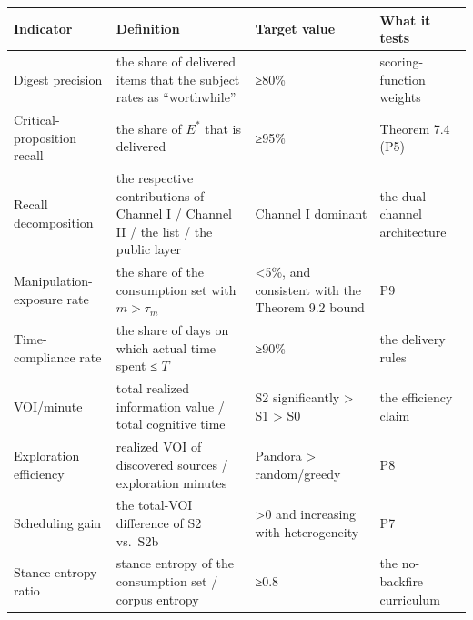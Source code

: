 \documentclass[
  11pt]{article}
\begin{document}
\begin{longtable}[]{@{}
  >{\raggedright\arraybackslash}p{}
  >{\raggedright\arraybackslash}p{}
  >{\raggedright\arraybackslash}p{}
  >{\raggedright\arraybackslash}p{}@{}}
\toprule\noalign{}
\begin{minipage}[b]{\linewidth}\raggedright
Indicator
\end{minipage} & \begin{minipage}[b]{\linewidth}\raggedright
Definition
\end{minipage} & \begin{minipage}[b]{\linewidth}\raggedright
Target value
\end{minipage} & \begin{minipage}[b]{\linewidth}\raggedright
What it tests
\end{minipage} \\
\midrule\noalign{}
\endhead
\bottomrule\noalign{}
\endlastfoot
Digest precision & the share of delivered items that the subject rates
as ``worthwhile'' & ≥80\% & scoring-function weights \\
Critical-proposition recall & the share of \(E^*\) that is delivered &
≥95\% & Theorem 7.4 (P5) \\
Recall decomposition & the respective contributions of Channel I /
Channel II / the list / the public layer & Channel I dominant & the
dual-channel architecture \\
Manipulation-exposure rate & the share of the consumption set with
\(m > \tau_m\) & \textless5\%, and consistent with the Theorem 9.2 bound
& P9 \\
Time-compliance rate & the share of days on which actual time spent ≤
\(T\) & ≥90\% & the delivery rules \\
VOI/minute & total realized information value / total cognitive time &
S2 significantly \textgreater{} S1 \textgreater{} S0 & the efficiency
claim \\
Exploration efficiency & realized VOI of discovered sources /
exploration minutes & Pandora \textgreater{} random/greedy & P8 \\
Scheduling gain & the total-VOI difference of S2 vs.~S2b & \textgreater0
and increasing with heterogeneity & P7 \\
Stance-entropy ratio & stance entropy of the consumption set / corpus
entropy & ≥0.8 & the no-backfire curriculum \\

\end{longtable}
\end{document}
